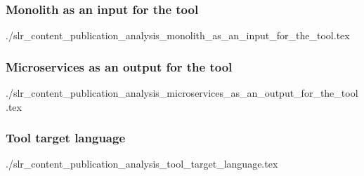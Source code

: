   \subsubsection{Monolith as an input for the tool}
  {./slr_content_publication_analysis_monolith_as_an_input_for_the_tool.tex}
  \subsubsection{Microservices as an output for the tool}
  {./slr_content_publication_analysis_microservices_as_an_output_for_the_tool.tex}
  \subsubsection{Tool target language}
  {./slr_content_publication_analysis_tool_target_language.tex}
